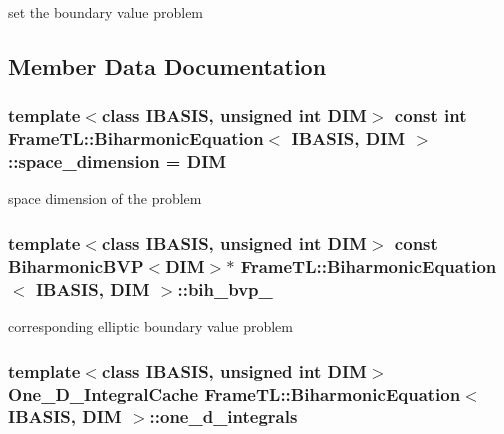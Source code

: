 set the boundary value problem 

\subsection{Member Data Documentation}
\hypertarget{classFrameTL_1_1BiharmonicEquation_8c79fee355dd2f68f56cd70a94e55511}{
\subsubsection[space\_\-dimension]{\setlength{\rightskip}{0pt plus 5cm}template$<$class IBASIS, unsigned int DIM$>$ const int {\bf FrameTL::BiharmonicEquation}$<$ IBASIS, DIM $>$::{\bf space\_\-dimension} = DIM}}
\label{classFrameTL_1_1BiharmonicEquation_8c79fee355dd2f68f56cd70a94e55511}


space dimension of the problem \hypertarget{classFrameTL_1_1BiharmonicEquation_31755efe61c40e44592198e134e4e2d0}{
\subsubsection[bih\_\-bvp\_\-]{\setlength{\rightskip}{0pt plus 5cm}template$<$class IBASIS, unsigned int DIM$>$ const BiharmonicBVP$<$DIM$>$$\ast$ {\bf FrameTL::BiharmonicEquation}$<$ IBASIS, DIM $>$::{\bf bih\_\-bvp\_\-}}}
\label{classFrameTL_1_1BiharmonicEquation_31755efe61c40e44592198e134e4e2d0}


corresponding elliptic boundary value problem \hypertarget{classFrameTL_1_1BiharmonicEquation_86bca5b3462307b9a3f20cd6f84c0e0f}{
\subsubsection[one\_\-d\_\-integrals]{\setlength{\rightskip}{0pt plus 5cm}template$<$class IBASIS, unsigned int DIM$>$ One\_\-D\_\-IntegralCache {\bf FrameTL::BiharmonicEquation}$<$ IBASIS, DIM $>$::{\bf one\_\-d\_\-integrals}}}
\label{classFrameTL_1_1BiharmonicEquation_86bca5b3462307b9a3f20cd6f84c0e0f}



